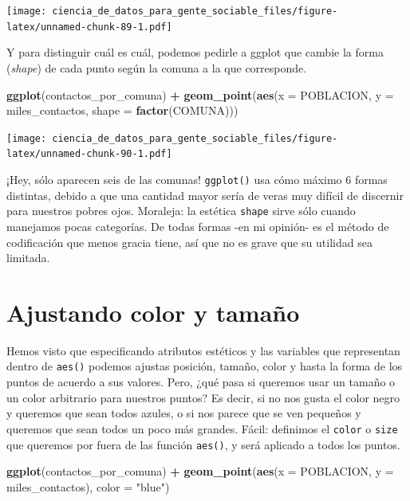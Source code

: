 \documentclass[spanish,]{book}
\newenvironment{Shaded}{\begin{snugshade}}{\end{snugshade}}
\newcommand{\DataTypeTok}[1]{\textcolor[rgb]{0.13,0.29,0.53}{#1}}
\newcommand{\KeywordTok}[1]{\textcolor[rgb]{0.13,0.29,0.53}{\textbf{#1}}}
\newcommand{\NormalTok}[1]{#1}
\newcommand{\OperatorTok}[1]{\textcolor[rgb]{0.81,0.36,0.00}{\textbf{#1}}}
\newcommand{\StringTok}[1]{\textcolor[rgb]{0.31,0.60,0.02}{#1}}
\begin{document}
\texttt{[image: ciencia\_de\_datos\_para\_gente\_sociable\_files/figure-latex/unnamed-chunk-89-1.pdf]}

Y para distinguir cuál es cuál, podemos pedirle a ggplot que cambie la forma (\emph{shape}) de cada punto según la comuna a la que corresponde.

\begin{Shaded}
\begin{Highlighting}[]
\KeywordTok{ggplot}\NormalTok{(contactos_por_comuna) }\OperatorTok{+}\StringTok{ }
\StringTok{    }\KeywordTok{geom_point}\NormalTok{(}\KeywordTok{aes}\NormalTok{(}\DataTypeTok{x =}\NormalTok{ POBLACION, }\DataTypeTok{y =}\NormalTok{ miles_contactos, }\DataTypeTok{shape =} \KeywordTok{factor}\NormalTok{(COMUNA)))}
\end{Highlighting}
\end{Shaded}

\texttt{[image: ciencia\_de\_datos\_para\_gente\_sociable\_files/figure-latex/unnamed-chunk-90-1.pdf]}

¡Hey, sólo aparecen seis de las comunas! \texttt{ggplot()} usa cómo máximo 6 formas distintas, debido a que una cantidad mayor sería de veras muy difícil de discernir para nuestros pobres ojos. Moraleja: la estética \texttt{shape} sirve sólo cuando manejamos pocas categorías. De todas formas -en mi opinión- es el método de codificación que menos gracia tiene, así que no es grave que su utilidad sea limitada.

\hypertarget{ajustando-color-y-tamauxf1o}{%
\section{Ajustando color y tamaño}\label{ajustando-color-y-tamauxf1o}}

Hemos visto que especificando atributos estéticos y las variables que representan dentro
de \texttt{aes()} podemos ajustas posición, tamaño, color y hasta la forma de los puntos de acuerdo a sus valores. Pero, ¿qué pasa si queremos usar un tamaño o un color arbitrario para nuestros puntos? Es decir, si no nos gusta el color negro y queremos que sean todos azules, o si nos parece que se ven pequeños y queremos que sean todos un poco más grandes. Fácil: definimos el \texttt{color} o \texttt{size} que queremos por fuera de las función \texttt{aes()}, y será aplicado a todos los puntos.

\begin{Shaded}
\begin{Highlighting}[]
\KeywordTok{ggplot}\NormalTok{(contactos_por_comuna) }\OperatorTok{+}\StringTok{ }
\StringTok{    }\KeywordTok{geom_point}\NormalTok{(}\KeywordTok{aes}\NormalTok{(}\DataTypeTok{x =}\NormalTok{ POBLACION, }\DataTypeTok{y =}\NormalTok{ miles_contactos), }\DataTypeTok{color =} \StringTok{"blue"}\NormalTok{)}
\end{Highlighting}
\end{Shaded}
\end{document}
